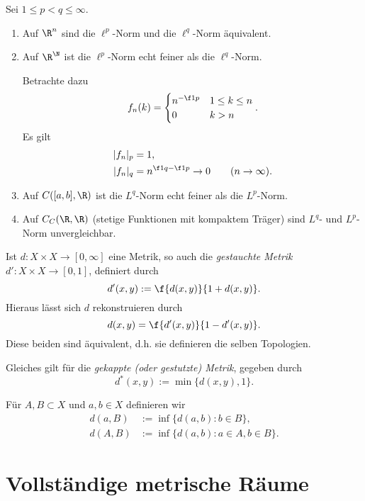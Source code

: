 \begin{ex}
	Sei $1 \le p < q \le \infty$.
	\begin{enumerate}[(1)]
		\item
			Auf $\R^n$ sind die $\ell^p$-Norm und die $\ell^q$-Norm äquivalent.
		\item
			Auf $\R^\N$ ist die $\ell^p$-Norm echt feiner als die $\ell^q$-Norm.

			Betrachte dazu
			\[
				f_n(k) = \begin{cases}
					n^{-\f 1p} & 1 \le k \le n \\
					0 & k > n
				\end{cases}.
			\]
			Es gilt
			\begin{align*}
				|f_n|_p &= 1, \\
				|f_n|_q &= n^{\f 1q-\f 1p} \to 0 \qquad (n\to \infty).
			\end{align*}
		\item
			Auf $C([a,b], \R)$ ist die $L^q$-Norm echt feiner als die $L^p$-Norm.
		\item
			Auf $C_C(\R,\R)$ (stetige Funktionen mit kompaktem Träger) sind $L^q$- und $L^p$-Norm unvergleichbar.
	\end{enumerate}
\end{ex}

\begin{ex}
	Ist $d: X \times X \to [0,\infty]$ eine Metrik, so auch die \emph{gestauchte Metrik} $d': X \times X \to [0,1]$, definiert durch
	\[
		d'(x,y) := \f {d(x,y)}{1 + d(x,y)}.
	\]
	Hieraus lässt sich $d$ rekonstruieren durch
	\[
		d(x,y) = \f {d'(x,y)}{1-d'(x,y)}.
	\]
	Diese beiden sind äquivalent, d.h. sie definieren die selben Topologien.

	Gleiches gilt für die \emph{gekappte (oder gestutzte) Metrik}, gegeben durch
	\[
		d^*(x,y) := \min \{d(x,y), 1 \}.
	\]
\end{ex}


Für $A, B \subset X$ und $a,b \in X$ definieren wir
\begin{align*}
	d(a,B)
		&:= \inf \{ d(a,b) : b \in B \}, \\
	d(A,B)
		&:= \inf \{ d(a,b) : a \in A, b \in B \}.
\end{align*}


\section{Vollständige metrische Räume}


